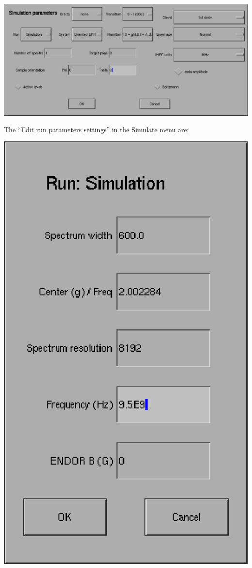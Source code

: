 \documentclass[byrevtex,amssymb,aps,pra,floatfix,letterpaper]{revtex4}
\begin{document}
\begin{center}
\includegraphics[scale=0.4]{fig1}
\end{center}

\noindent
The ``Edit run parameters settings'' in the Simulate menu are:

\begin{center}
\includegraphics[scale=0.4]{fig2}
\end{center}
\end{document}
